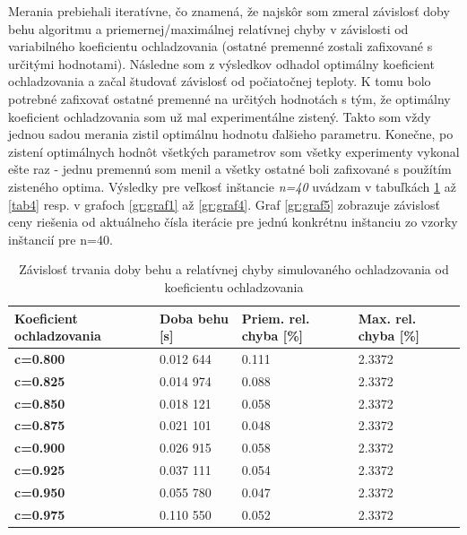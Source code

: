 \documentclass[slovak]{article}
\begin{document}
Merania prebiehali iteratívne, čo znamená, že najskôr som zmeral závislosť doby behu algoritmu a priemernej/maximálnej relatívnej chyby v závislosti od variabilného koeficientu ochladzovania (ostatné premenné zostali zafixované s určitými hodnotami). Následne som z výsledkov odhadol optimálny koeficient ochladzovania a začal študovať závislosť od počiatočnej teploty. K tomu bolo potrebné zafixovať ostatné premenné na určitých hodnotách s tým, že optimálny koeficient ochladzovania som už mal experimentálne zistený. Takto som vždy jednou sadou merania zistil optimálnu hodnotu ďalšieho parametru. Konečne, po zistení optimálnych hodnôt všetkých parametrov som všetky experimenty vykonal ešte raz - jednu premennú som menil a všetky ostatné boli zafixované s použítím zisteného optima. Výsledky pre veľkosť inštancie \emph{n=40} uvádzam v tabuľkách \ref{tab1} až \ref{tab4} resp. v grafoch \ref{gr:graf1} až \ref{gr:graf4}. Graf \ref{gr:graf5} zobrazuje závislosť ceny riešenia od aktuálneho čísla iterácie pre jednú konkrétnu inštanciu zo vzorky inštancií pre n=40. 

\begin{table}[htb!]\centering
	\begin{tabularx}{\textwidth}{ | X | X | X | X |}
	  \hline                       
		\textbf{Koeficient ochladzovania}	& \textbf{Doba behu [s]} 	& \textbf{Priem. rel. chyba [\%]} 	& \textbf{Max. rel. chyba [\%]} 	\\ \hline
		\textbf{c=0.800}	&	0.012 644	&	0.111	&	2.3372	\\ \hline
		\textbf{c=0.825}	&	0.014 974	&	0.088 	&	2.3372	\\ \hline
		\textbf{c=0.850}	&	0.018 121	&	0.058	&	2.3372	\\ \hline
		\textbf{c=0.875}	&	0.021 101	&	0.048	&	2.3372	\\ \hline
		\textbf{c=0.900}	&	0.026 915	&	0.058	&	2.3372	\\ \hline
		\textbf{c=0.925}	&	0.037 111	&	0.054	&	2.3372	\\ \hline
		\textbf{c=0.950}	&	0.055 780	&	0.047	&	2.3372	\\ \hline
		\textbf{c=0.975}	&	0.110 550	&	0.052	&	2.3372	\\ \hline
	\end{tabularx}
\caption{Závislosť trvania doby behu a relatívnej chyby simulovaného ochladzovania od koeficientu ochladzovania}
\label{tab1}
\end{table}
\end{document}
